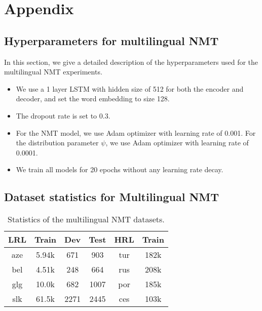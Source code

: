 \section{\label{app} Appendix}

\subsection{\label{app:nmt_hparam} Hyperparameters for multilingual NMT}
In this section, we give a detailed description of the hyperparameters used for the multilingual NMT experiments.
\begin{itemize}
    \item We use a 1 layer LSTM with hidden size of 512 for both the encoder and decoder, and set the word embedding to size 128.
    \item The dropout rate is set to 0.3.
    \item For the NMT model, we use Adam optimizer with learning rate of 0.001. For the distribution parameter $\psi$, we use Adam optimizer with learning rate of 0.0001.
    \item We train all models for 20 epochs without any learning rate decay.
\end{itemize}

\subsection{\label{app:nmt_data} Dataset statistics for Multilingual NMT}
\begin{table}[H]
  \centering
  \begin{tabular}{c|ccc|cc}
  \toprule
  \textbf{LRL} & \textbf{Train} & \textbf{Dev} & \textbf{Test} & \textbf{HRL} & \textbf{Train} \\
  \midrule
  aze & 5.94k &  671 &  903 & tur & 182k \\
  bel & 4.51k &  248 &  664 & rus & 208k \\
  glg & 10.0k &  682 & 1007 & por & 185k \\
  slk & 61.5k & 2271 & 2445 & ces & 103k\\
  \bottomrule
  \end{tabular}
  \vspace{0.2cm}
  \caption{\label{tab:nmt_data}Statistics of the multilingual NMT datasets.}
\end{table} 

